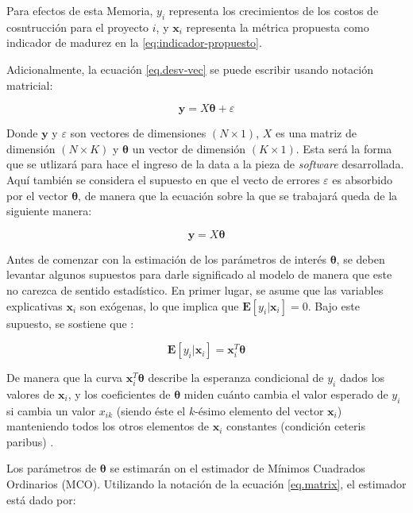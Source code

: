 Para efectos de esta Memoria, $y_i$ representa los crecimientos de los costos de cosntrucción para el proyecto $i$, y $\bm{x}_i$ representa la métrica propuesta como indicador de madurez en la \eqref{eq:indicador-propuesto}.


Adicionalmente, la ecuación \eqref{eq.desv-vec} se puede escribir usando notación matricial:

\begin{equation}
    \label{eq.matrix}
    \bm{y} = X\bm{\theta} + \varepsilon
\end{equation}

Donde $\bm{y}$ y $\varepsilon$ son vectores de dimensiones $(N\times1)$, $X$ es una matriz de dimensión $(N\times K)$ y $\bm{\theta}$ un vector de dimensión $(K\times1)$. Esta será la forma que se utlizará para hace el ingreso de la data a la pieza de \emph{software} desarrollada. Aquí también se considera el supuesto en que el vecto de errores $\varepsilon$ es absorbido por el vector $\bm{\theta}$, de manera que la ecuación sobre la que se trabajará queda de la siguiente manera:

\begin{equation}
    \label{eq:matricial-final}
    \bm{y} = X\bm{\theta}
\end{equation}

Antes de comenzar con la estimación de los parámetros de interés $\bm{\theta}$, se deben levantar algunos supuestos para darle significado al modelo de manera que este no carezca de sentido estadístico. En primer lugar, se asume que las variables explicativas $\bm{x}_i$ son exógenas, lo que implica que $\bm{E}[y_i|\bm{x}_i]=0$. Bajo este supuesto, se sostiene que :

\begin{equation}
    \label{eq.e-xb}
    \bm{E}[y_i|\bm{x}_i] = \bm{x}_i^T\bm{\theta}
\end{equation}

De manera que la curva $\bm{x}_i^T\bm{\theta}$ describe la esperanza condicional de $y_i$ dados los valores de $\bm{x}_i$, y los coeficientes de $\bm{\theta}$ miden cuánto cambia el valor esperado de $y_i$ si cambia un valor $x_{ik}$ (siendo éste el $k$-ésimo elemento del vector $\bm{x}_i$) manteniendo todos los otros elementos de $\bm{x}_i$ constantes (condición ceteris paribus) \cite{verbeek}.

Los parámetros de $\bm{\theta}$ se estimarán on el estimador de Mínimos Cuadrados Ordinarios (MCO). Utilizando la notación de la ecuación \eqref{eq.matrix}, el estimador está dado por:

